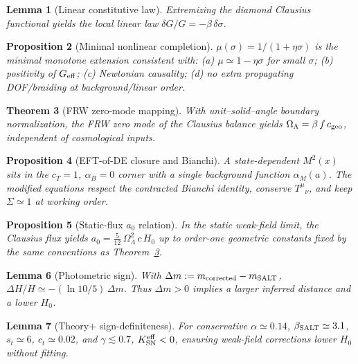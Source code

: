 \documentclass[aps,prd,preprint,onecolumn,longbibliography,nofootinbib]{revtex4-2}
\theoremstyle{plain}
\newtheorem{theorem}{Theorem}
\newtheorem{proposition}[theorem]{Proposition}
\newtheorem{lemma}[theorem]{Lemma}
\theoremstyle{remark}
\newcommand{\OmL}{\Omega_\Lambda}
\newcommand{\Hzero}{H_0}
\newcommand{\alM}{\alpha_{\!M}}
\newcommand{\alB}{\alpha_{\!B}}
\newcommand{\be}{\beta}
\newcommand{\beS}{\beta_{\rm SALT}}
\newcommand{\Sig}{\Sigma} %
\newcommand{\Geff}{G_{\rm eff}}
\begin{document}
\begin{lemma}[Linear constitutive law]\label{lem:deltaG}
Extremizing the diamond Clausius functional yields the local linear law $\delta G/G=-\be\,\delta\sigma$.
\end{lemma}

\begin{proposition}[Minimal nonlinear completion]\label{prop:pade}
$\mu(\sigma)=1/(1+\eta\sigma)$ is the minimal monotone extension consistent with: (a) $\mu\simeq 1-\eta\sigma$ for small $\sigma$; (b) positivity of $\Geff$; (c) Newtonian causality; (d) no extra propagating DOF/braiding at background/linear order.
\end{proposition}

\begin{theorem}[FRW zero-mode mapping]\label{thm:Omegalambda}
With unit–solid–angle boundary normalization, the FRW zero mode of the Clausius balance yields $\OmL=\be\,f\,c_{\rm geo}$, independent of cosmological inputs.
\end{theorem}

\begin{proposition}[EFT-of-DE closure and Bianchi]\label{prop:eft-bianchi}
A state-dependent $M^2(x)$ sits in the $c_T\!=\!1$, $\alB\!=\!0$ corner with a single background function $\alM(a)$. The modified equations respect the contracted Bianchi identity, conserve $T^\mu{}_\nu$, and keep $\Sig\simeq 1$ at working order.
\end{proposition}

\begin{proposition}[Static-flux $a_0$ relation]\label{prop:a0}
In the static weak-field limit, the Clausius flux yields $a_0 = \frac{5}{12}\,\OmL^2\,c\,\Hzero$ up to order-one geometric constants fixed by the same conventions as Theorem~\ref{thm:Omegalambda}.
\end{proposition}

\begin{lemma}[Photometric sign]\label{lem:photometric-sign}
With $\Delta m := m_{\rm corrected}-m_{\rm SALT}$, $\Delta H/H \simeq -(\ln 10/5)\,\Delta m$. Thus $\Delta m>0$ implies a larger inferred distance and a lower $\Hzero$.
\end{lemma}

\begin{lemma}[Theory+ sign-definiteness]\label{lem:theoryplus-sign}
For conservative $\alpha\simeq0.14$, $\beS\simeq3.1$, $s_t\simeq6$, $c_t\simeq0.02$, and $\gamma\lesssim0.7$, $K^{\rm eff}_{\rm SN}<0$, ensuring weak-field corrections lower $\Hzero$ without fitting.
\end{lemma}
\end{document}
